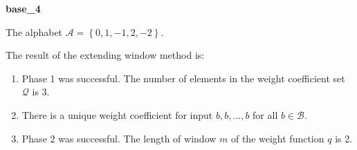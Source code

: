 \begin{exmp}
\textbf{ base\_4 }

\label{ex:base4}

The alphabet $\mathcal{A} =\left\{0, 1, -1, 2, -2\right\}$.

The result of the extending window method is:
\begin{enumerate}
    \item Phase 1 was successful.
The number of elements in the weight coefficient set $\mathcal{Q}$ is $3$.

    \item There is a unique weight coefficient for input $b,b,\dots,b$ for all $b\in\mathcal{B}$.

    \item Phase 2 was successful.
The length of window $m$ of the weight function $q$ is 2.
\end{enumerate}
\end{exmp}
